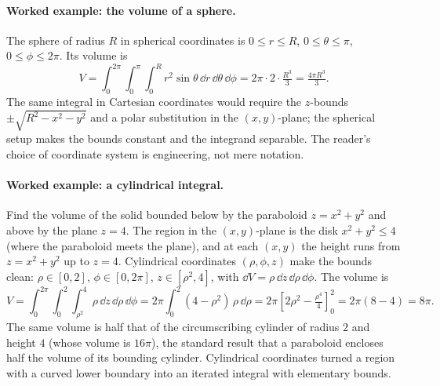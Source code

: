\paragraph{Worked example: the volume of a sphere.} The sphere of
radius $R$ in spherical coordinates is $0 \leq r \leq R$, $0 \leq
\theta \leq \pi$, $0 \leq \phi \leq 2\pi$. Its volume is
\[
V = \int_{0}^{2\pi}\!\int_{0}^{\pi}\!\int_{0}^{R} r^{2} \sin\theta
\,\dd r\,\dd\theta\,\dd\phi = 2\pi \cdot 2 \cdot \tfrac{R^{3}}{3} =
\tfrac{4\pi R^{3}}{3}.
\]
The same integral in Cartesian coordinates would require the
$z$-bounds $\pm\sqrt{R^{2} - x^{2} - y^{2}}$ and a polar substitution
in the $(x, y)$-plane; the spherical setup makes the bounds constant
and the integrand separable. The reader's choice of coordinate
system is engineering, not mere notation.

\paragraph{Worked example: a cylindrical integral.} Find the volume
of the solid bounded below by the paraboloid $z = x^{2} + y^{2}$ and
above by the plane $z = 4$. The region in the $(x, y)$-plane is the
disk $x^{2} + y^{2} \leq 4$ (where the paraboloid meets the plane),
and at each $(x, y)$ the height runs from $z = x^{2} + y^{2}$ up to
$z = 4$. Cylindrical coordinates $(\rho, \phi, z)$ make the bounds
clean: $\rho \in [0, 2]$, $\phi \in [0, 2\pi]$, $z \in [\rho^{2},
4]$, with $\dd V = \rho\,\dd z\,\dd\rho\,\dd\phi$. The volume is
\[
V = \int_{0}^{2\pi}\!\int_{0}^{2}\!\int_{\rho^{2}}^{4}
\rho\,\dd z\,\dd\rho\,\dd\phi
= 2\pi\int_{0}^{2}(4 - \rho^{2})\,\rho\,\dd\rho
= 2\pi\left[2\rho^{2} - \tfrac{\rho^{4}}{4}\right]_{0}^{2}
= 2\pi(8 - 4) = 8\pi.
\]
The same volume is half that of the circumscribing cylinder of radius
$2$ and height $4$ (whose volume is $16\pi$), the standard result
that a paraboloid encloses half the volume of its bounding cylinder.
Cylindrical coordinates turned a region with a curved lower boundary
into an iterated integral with elementary bounds.

